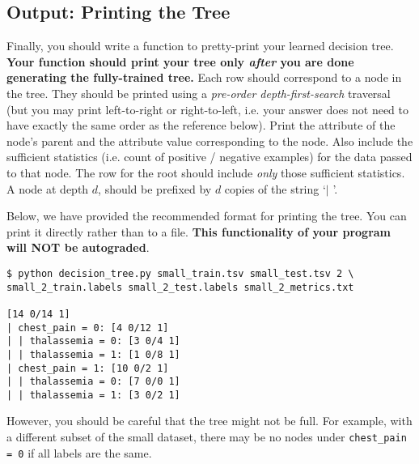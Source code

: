 \documentclass[11pt,addpoints,answers]{exam}
\begin{document}
\subsection{Output: Printing the Tree}
\label{sec:printtree}

Finally, you should write a function to pretty-print your learned decision tree. \textbf{Your function should print your tree only \emph{after} you are done generating the fully-trained tree.} Each row should correspond to a node in the tree. They should be printed using a \emph{pre-order depth-first-search} traversal (but you may print left-to-right or right-to-left, i.e. your answer does not need to have exactly the same order as the reference below). Print the attribute of the node's parent and the attribute value corresponding to the node. Also include the sufficient statistics (i.e. count of positive / negative examples) for the data passed to that node. The row for the root should include \emph{only} those sufficient statistics. A node at depth $d$, should be prefixed by $d$ copies of the string `$\mid$ '.

Below, we have provided the recommended format for printing the tree. You can print it directly rather than to a file. \textbf{This functionality of your program will NOT be autograded}.

\begin{lstlisting}[language=Shell]
$ python decision_tree.py small_train.tsv small_test.tsv 2 \ 
small_2_train.labels small_2_test.labels small_2_metrics.txt

[14 0/14 1]
| chest_pain = 0: [4 0/12 1]
| | thalassemia = 0: [3 0/4 1]
| | thalassemia = 1: [1 0/8 1]
| chest_pain = 1: [10 0/2 1]
| | thalassemia = 0: [7 0/0 1]
| | thalassemia = 1: [3 0/2 1]
\end{lstlisting}

However, you should be careful that the tree might not be full. For example, with a different subset of the small dataset, there may be no nodes under \lstinline{chest_pain = 0} if all labels are the same. %


\end{document}
